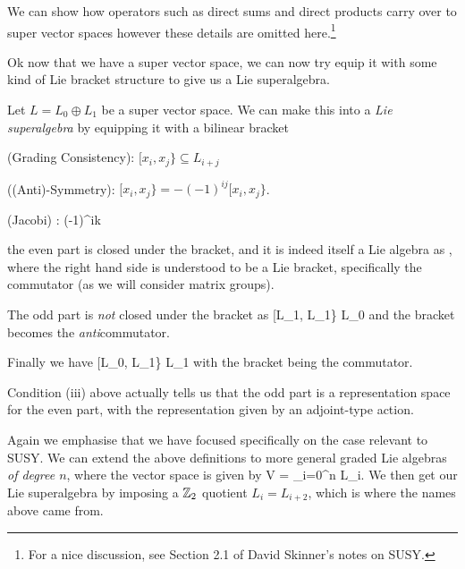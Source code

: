 We can show how operators such as direct sums and direct products carry over to super vector spaces however these details are omitted here.\footnote{For a nice discussion, see Section 2.1 of David Skinner's notes on SUSY.}

Ok now that we have a super vector space, we can now try equip it with some kind of Lie bracket structure to give us a Lie superalgebra. 

    Let $L=L_0\oplus L_1$ be a super vector space. We can make this into a \textit{Lie superalgebra} by equipping it with a bilinear bracket 
    \bse 
        [\cdot, \cdot\} : L \times L \to L,
    \ese 
    obeying: for all $x_i\in L_i$ and $x_j \in L_j$
    \ben[label=(\roman*)] 
        \item (Grading Consistency): $[ x_i , x_j \} \subseteq L_{i+j}$  
        \item ((Anti)-Symmetry): $[x_i , x_j\} = -(-1)^{ij} [x_i , x_j\}$.
        \item (Jacobi) :
            \bse 
                (-1)^{ik} \big[x_i , [x_j , x_k\} \big\} + (-1)^{kj} \big[x_k , [x_i , x_j\} \big\} + (-1)^{ji} \big[x_j , [x_k , x_i\} \big\} = 0. 
            \ese 
    \een 
\ed 

Let's break this down a little bit. From the above properties, we can see that
\ben[label=(\roman*)]
    \item the even part is closed under the bracket, and it is indeed itself a Lie algebra as 
    \bse 
        [L_0, L_0\} = [L_0,L_0],
    \ese 
    where the right hand side is understood to be a Lie bracket, specifically the commutator (as we will consider matrix groups).
    \item The odd part is \textit{not} closed under the bracket as 
    \bse 
        [L_1, L_1\} \subseteq L_0
    \ese 
    and the bracket becomes the \textit{anti}commutator.
    \item Finally we have 
    \bse 
        [L_0, L_1\} \subseteq L_1
    \ese
    with the bracket being the commutator. 
\een 

\br 
    Condition (iii) above actually tells us that the odd part is a representation space for the even part, with the representation given by an adjoint-type action.
\er 

\br 
    Again we emphasise that we have focused specifically on the case relevant to SUSY. We can extend the above definitions to more general graded Lie algebras \textit{of degree $n$}, where the vector space is given by 
    \bse 
        V = \bigoplus_{i=0}^n L_i.
    \ese
    We then get our Lie superalgebra by imposing a $\mathbb{Z}_2$ quotient $L_i = L_{i+2}$, which is where the names above came from. 
\er 

